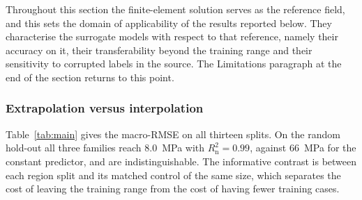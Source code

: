 Throughout this section the finite-element solution serves as the reference field, and this sets the domain of applicability of the results reported below. They characterise the surrogate models with respect to that reference, namely their accuracy on it, their transferability beyond the training range and their sensitivity to corrupted labels in the source. The Limitations paragraph at the end of the section returns to this point. %

\subsubsection{Extrapolation versus interpolation}
\label{sec:res_extrap}


Table~\ref{tab:main} gives the macro-RMSE on all thirteen splits. On the random hold-out all three families reach 8.0~MPa with $R^2_{\mathrm{n}}=0.99$, against 66~MPa for the constant predictor, and are indistinguishable. The informative contrast is between each region split and its matched control of the same size, which separates the cost of leaving the training range from the cost of having fewer training cases.

